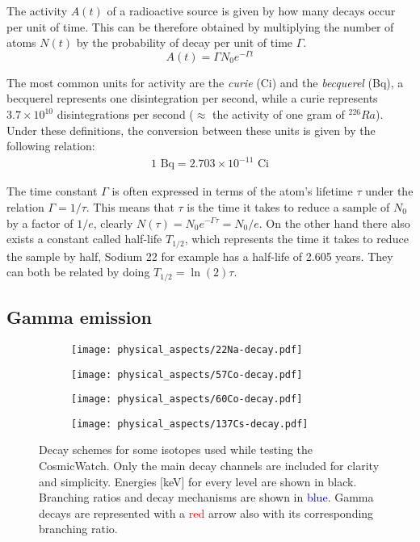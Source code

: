 The activity $A(t)$ of a radioactive source is given by how many decays occur per unit of time. This can be therefore obtained by multiplying the number of atoms $N(t)$ by the probability of decay per unit of time $\Gamma$.
\begin{equation}
    A(t) = \Gamma N_0 e^{-\Gamma t}
\end{equation}

The most common units for activity are the \textit{curie} (Ci) and the \textit{becquerel} (Bq), a becquerel represents one disintegration per second, while a curie represents $3.7\times10^{10}$ disintegrations per second ($\approx$ the activity of one gram of $^{226}Ra$). Under these definitions, the conversion between these units is given by the following relation:
\begin{eqnarray}
    1 \text{~Bq} = 2.703\times10^{-11} \text{~Ci}
\end{eqnarray}

The time constant $\Gamma$ is often expressed in terms of the atom's lifetime $\tau$ under the relation $\Gamma=1/\tau$. This means that $\tau$ is the time it takes to reduce a sample of $N_0$ by a factor of $1/e$, clearly $N(\tau)=N_0e^{-\Gamma \tau} = N_0/e$. On the other hand there also exists a constant called half-life $T_{1/2}$, which represents the time it takes to reduce the sample by half, Sodium 22 for example has a half-life of 2.605 years. They can both be related by doing $T_{1/2} = \ln (2)\tau$.

\subsection{Gamma emission}

\begin{figure}
  \centering
  \begin{subfigure}[t]{0.45\textwidth}
    \texttt{[image: physical\_aspects/22Na-decay.pdf]}
    \caption{\label{sfig:22Na}}
  \end{subfigure}
  \begin{subfigure}[t]{0.425\textwidth}
    \texttt{[image: physical\_aspects/57Co-decay.pdf]}
    \caption{\label{sfig:57Co}}
  \end{subfigure}
  \medskip
  \centering
  \begin{subfigure}[t]{0.425\textwidth}
    \texttt{[image: physical\_aspects/60Co-decay.pdf]}
    \caption{\label{sfig:60Co}}
  \end{subfigure}
  \begin{subfigure}[t]{0.425\textwidth}
    \texttt{[image: physical\_aspects/137Cs-decay.pdf]}
    \caption{\label{sfig:137Cs}}
  \end{subfigure}
  \caption{\label{fig:decay_schemes}Decay schemes for some isotopes used while testing the CosmicWatch. Only the main decay channels are included for clarity and simplicity. Energies [\unit{\kilo\eV}] for every level are shown in black. Branching ratios and decay mechanisms are shown in \textcolor{blue}{blue}. Gamma decays are represented with a \textcolor{red}{red} arrow also with its corresponding branching ratio.}
\end{figure}

